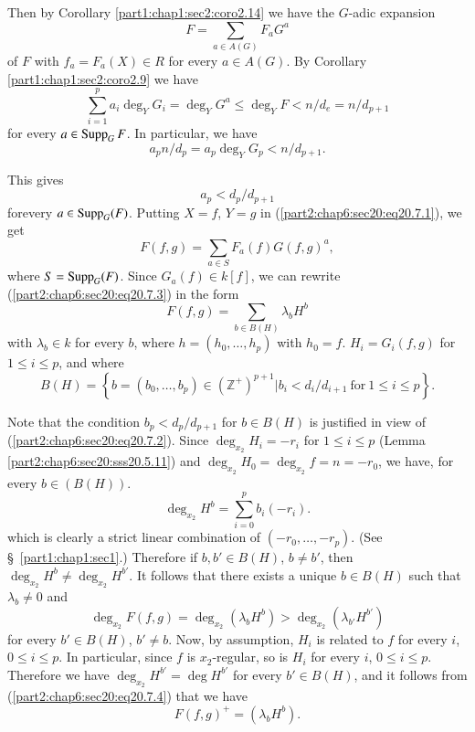 Then by Corollary \ref{part1:chap1:sec2:coro2.14} we have the $G$-adic
expansion 
\begin{equation*}
  F = \sum_{a \in A(G)} F_a G^a
  \tag{20.7.1}\label{part2:chap6:sec20:eq20.7.1} 
\end{equation*}
of $F$ with $f_a= F_a(X) \in R$ for every $a \in A(G)$. By Corollary
\ref{part1:chap1:sec2:coro2.9} we have
$$
\sum_{i=1}^p a_i \deg_Y G_i = \deg_Y G^a \leq \deg_Y F< n/d_e = n/d_{p+1}
$$
for every $a \in \operatorname{Supp}_G {F}$. In particular, we have
$$
a_p n/d_p= a_p \deg_Y G_p < n/d_{p+1}.
$$

This gives
\begin{equation*}
  a_p < d_p /d_{p+1} \tag{20.7.2}\label{part2:chap6:sec20:eq20.7.2} 
\end{equation*}
for\pageoriginale every $a \in \operatorname{Supp}_G (F)$. Putting $X=f$, $Y=g$
in (\ref{part2:chap6:sec20:eq20.7.1}), we get
\begin{equation*}
  F(f, g) = \sum\limits_{a \in S} F_a (f) G(f, g)^a,
  \tag{20.7.3}\label{part2:chap6:sec20:eq20.7.3}  
\end{equation*}
where $S = \operatorname{Supp}_G (F)$. Since $G_a (f) \in k [f]$, we can rewrite
(\ref{part2:chap6:sec20:eq20.7.3}) in the form 
$$
F(f, g)= \sum_{b \in B(H)} \lambda_b H^b
$$
with $\lambda_b \in k$ for every $b$, where $h= (h_0, \ldots , h_p)$
with $h_0 = f$. $H_i = G_i (f, g)$ for $1 \leq i \leq p$, and where
$$
B(H) = \left\{ b= (b_0 , \ldots , b_p) \in (\mathbb{Z}^+)^{p+1} \Big|
b_i < d_i /d_{i+1} ~\text{for}~ 1 \leq i \leq p\right\}.
$$

Note that the condition $b_p < d_p /d_{p+1}$ for $b \in B(H)$ is
justified in view of (\ref{part2:chap6:sec20:eq20.7.2}). Since
$\deg_{x_2} H_i =- r_i$ for $1 \leq i \leq p$
(Lemma \ref{part2:chap6:sec20:sss20.5.11}) and $\deg_{x_2} H_0 =
\deg_{x_2} f= n=- r_0$, we have, for every $b \in (B(H))$.
$$
\deg_{x_2} H^b= \sum_{i=0}^p b_i (- r_i).
$$
which is clearly a strict linear combination of $(- r_0, \ldots ,
-r_p)$. (See \S\ \ref{part1:chap1:sec1}.) Therefore if $b, b' \in
B(H)$, $b \neq b'$, then $\deg_{x_2} H^b \neq \deg_{x_2} H^{b'}$. It
follows that there exists a unique $b \in B(H)$ such that $\lambda_b
\neq 0$ and 
\begin{equation*}
  \deg_{x_2} F(f, g)= \deg_{x_2} (\lambda_b H^b)> \deg_{x_2}
  (\lambda_{b'} H^{b'})\tag{20.7.4}\label{part2:chap6:sec20:eq20.7.4}
\end{equation*}
for every $b' \in B(H)$, $b' \neq b$. Now, by assumption, $H_i$ is
related to $f$ for every $i$, $0 \leq i \leq p$. In particular, since
$f$ is $x_2$-regular, so is $H_i$ for every $i$, $0 \leq i \leq
p$. Therefore we have $\deg_{x_2} H^{b'}= \deg H^{b'}$ for every $b'
\in B(H)$, and it follows from (\ref{part2:chap6:sec20:eq20.7.4}) that
we have
$$
F(f, g)^+= (\lambda_b H^b).
$$

